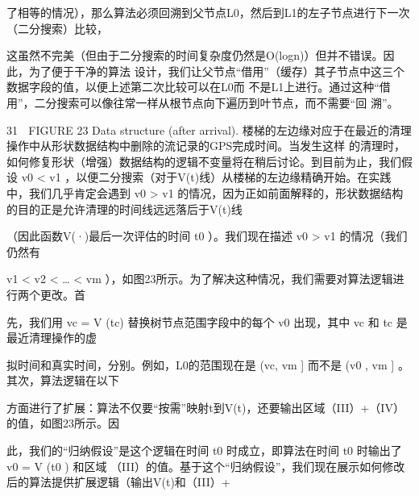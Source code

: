 了相等的情况），那么算法必须回溯到父节点L0，然后到L1的左子节点进行下一次（二分搜索）比较，
                         ​           ​               ​       ​




这虽然不完美（但由于二分搜索的时间复杂度仍然是O(logn)）但并不错误。因此，为了便于干净的算法
设计，我们让父节点“借用”（缓存）其子节点中这三个数据字段的值，以便上述第二次比较可以在L0而
不是L1上进行。通过这种“借用”，二分搜索可以像往常一样从根节点向下遍历到叶节点，而不需要“回
溯”。




                                                                                             31
                        FIGURE 23 Data structure (after arrival).
楼梯的左边缘对应于在最近的清理操作中从形状数据结构中删除的流记录的GPS完成时间。当发生这样
的清理时，如何修复形状（增强）数据结构的逻辑不变量将在稍后讨论。到目前为止，我们假设
 v0 < v1 ，以便二分搜索（对于V(t)线）从楼梯的左边缘精确开始。在实践中，我们几乎肯定会遇到
 v0 > v1 的情况，因为正如前面解释的，形状数据结构的目的正是允许清理的时间线远远落后于V(t)线
      ​   ​




（因此函数V(·)最后一次评估的时间 t0 ）。我们现在描述 v0 > v1 的情况（我们仍然有
      ​   ​




 v1 < v2 < … < vm ），如图23所示。为了解决这种情况，我们需要对算法逻辑进行两个更改。首
                        ​                    ​   ​




先，我们用 vc = V (tc) 替换树节点范围字段中的每个 v0 出现，其中 vc 和 tc 是最近清理操作的虚
      ​   ​   ​




拟时间和真实时间，分别。例如，L0的范围现在是 (vc, vm ] 而不是 (v0 , vm ] 。其次，算法逻辑在以下
                                     ​




方面进行了扩展：算法不仅要“按需”映射t到V(t)，还要输出区域（III）+（IV）的值，如图23所示。因
                                         ​               ​   ​




此，我们的“归纳假设”是这个逻辑在时间 t0 时成立，即算法在时间 t0 时输出了 v0 = V (t0 ) 和区域
（III）的值。基于这个“归纳假设”，我们现在展示如何修改后的算法提供扩展逻辑（输出V(t)和（III）+
                            ​                        ​           ​   ​




